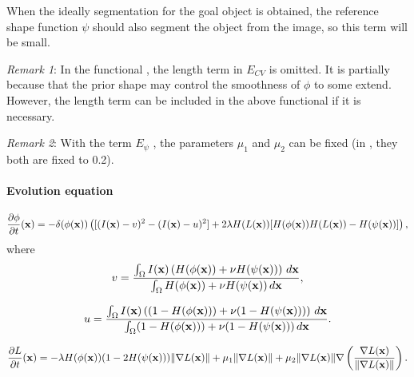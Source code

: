 When the ideally segmentation for the goal object is obtained, the reference shape function $\psi$ should also segment the object from the image, so this term will be small.
\vspace{0.3cm}

\emph{Remark 1}: In the functional , the length term in $E_{CV}$ is omitted. It is partially because that the prior shape may control the smoothness of $\phi$ to some extend. However, the length term can be included in the above functional if it is necessary.

\emph{Remark 2}: With the term $E_\psi$ , the parameters $\mu_1$ and $\mu_2$ can be fixed (in \cite{Chan2005}, they both are fixed to 0.2).


\paragraph{Evolution equation}
\begin{equation}
  \label{eq:evol_chan2005}
  \frac{\partial \phi}{\partial t}(\mathbf{x}) = -\delta(\phi(\mathbf{x})) \left([(I(\mathbf{x}) - v)^2 - (I(\mathbf{x}) - u)^2] + 2\lambda H(L(\mathbf{x})) [H(\phi(\mathbf{x}))H(L(\mathbf{x})) - H(\psi(\mathbf{x}))] \right),
\end{equation}
where
\begin{equation}
  \label{eq:evol_chan2005_v}
  v = \frac{\int_\Omega I(\mathbf{x}) \left(H(\phi(\mathbf{x})) + \nu H(\psi(\mathbf{x})) \right) \, d\mathbf{x}}{\int_\Omega H(\phi(\mathbf{x})) + \nu H(\psi(\mathbf{x})) \, d\mathbf{x}},
\end{equation}

\begin{equation}
  \label{eq:evol_chan2005_u}
  u = \frac{\int_\Omega I(\mathbf{x}) \left( (1-H(\phi(\mathbf{x}))) + \nu (1-H(\psi(\mathbf{x}))) \right) \, d\mathbf{x}}{\int_\Omega (1-H(\phi(\mathbf{x}))) + \nu (1-H(\psi(\mathbf{x}))) \, d\mathbf{x}}.
\end{equation}

\begin{equation}
  \label{eq:evol_chan2005_L}
   \frac{\partial L}{\partial t}(\mathbf{x}) = -\lambda H(\phi(\mathbf{x}))(1-2H(\psi(\mathbf{x}))) \| \nabla L(\mathbf{x}) \| + \mu_1 \| \nabla L(\mathbf{x}) \| + \mu_2 \| \nabla L(\mathbf{x}) \| \nabla \left( \frac{\nabla L(\mathbf{x})}{\| \nabla L(\mathbf{x}) \|} \right).
\end{equation}

